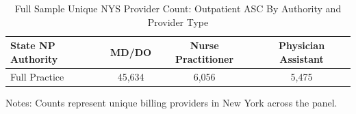\documentclass{article}
\begin{document}
\begin{table}[htbp]
\centering
\caption{Full Sample Unique NYS Provider Count: Outpatient ASC By Authority and Provider Type}
\label{tab:outpatient_auth_x_provtype_full}
\begin{threeparttable}
\begin{tabular}{lccc}
\toprule
\textbf{State NP Authority} & \textbf{MD/DO} & \textbf{Nurse Practitioner} & \textbf{Physician Assistant} \\
\midrule
        Full Practice & 45,634 & 6,056 & 5,475 \\
\bottomrule
\end{tabular}
\begin{tablenotes}[flushleft]
\footnotesize
\item Notes: Counts represent unique billing providers in New York across the panel.
\end{tablenotes}
\end{threeparttable}
\end{table}
\end{document}
